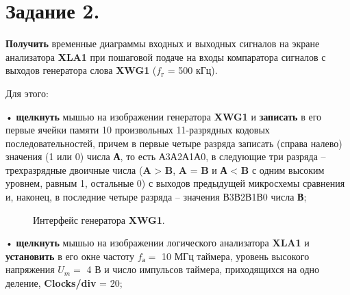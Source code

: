\documentclass[bachelor, och, otchet, hidelinks]{SCWorks}
\begin{document}
\newpage

\section*{Задание 2.}

\textbf{Получить} временные диаграммы входных и выходных сигналов на экране анализатора \textbf{XLA1} при 
пошаговой подаче на входы компаратора сигналов с выходов генератора слова \textbf{XWG1} ($ f_\text{г} $ 
= 500 кГц).

Для этого: 

\par • \textbf{щелкнуть} мышью на изображении генератора \textbf{XWG1} и \textbf{записать} в его первые ячейки 
памяти 10 произвольных 11-разрядных кодовых последовательностей, причем в первые четыре разряда записать 
(справа налево) значения (1 или 0) числа \textbf{А}, то есть А3А2А1А0, в следующие три разряда – 
трехразрядные двоичные числа (\textbf{A} > \textbf{B}, \textbf{A} = \textbf{B} и \textbf{А} < \textbf{B} с 
одним высоким уровнем, равным 1, остальные 0) с выходов предыдущей микросхемы сравнения и, наконец, 
в последние четыре разряда – значения В3В2В1В0 числа \textbf{В}; 

\begin{figure}[h]
	\caption{Интерфейс генератора \textbf{XWG1}.}
\end{figure}

\par • \textbf{щелкнуть} мышью на изображении логического анализатора \textbf{XLA1} и \textbf{установить}
в его окне частоту $ f_\text{а} = $ 10 МГц таймера, уровень высокого напряжения $ U_m = $ 4 В и число импульсов 
таймера, приходящихся на одно деление, \textbf{Clocks/div} = 20;
\end{document}
